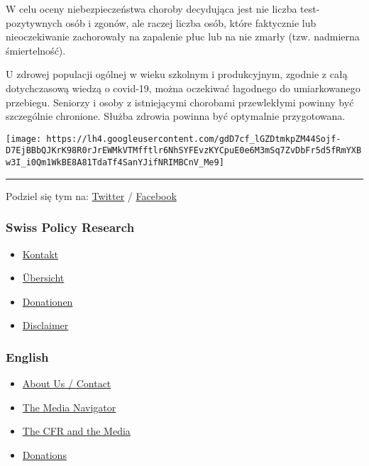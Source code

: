 W celu oceny niebezpieczeństwa choroby decydująca jest nie liczba
test-pozytywnych osób i zgonów, ale raczej liczba osób, które faktycznie
lub nieoczekiwanie zachorowały na zapalenie płuc lub na nie zmarły (tzw.
nadmierna śmiertelność).

U zdrowej populacji ogólnej w wieku szkolnym i produkcyjnym, zgodnie z
całą dotychczasową wiedzą o covid-19, można oczekiwać łagodnego do
umiarkowanego przebiegu. Seniorzy i osoby z istniejącymi chorobami
przewlekłymi powinny być szczególnie chronione. Służba zdrowia powinna
być optymalnie przygotowana.

\texttt{[image: https://lh4.googleusercontent.com/gdD7cf\_lGZDtmkpZM44Sojf-D7EjBBbQJKrK98R0rJrEWMkVTMfftlr6NhSYFEvzKYCpuE0e6M3mSq7ZvDbFr5d5fRmYXBw3I\_i0Qm1WkBE8A81TdaTf4SanYJifNRIMBCnV\_Me9]}

\begin{center}\rule{0.5\linewidth}{\linethickness}\end{center}

Podziel się tym na:
\href{https://twitter.com/intent/tweet?url=https://swprs.org//szwajcarski-lekarz-o-covid-19/}{Twitter}
/
\href{https://www.facebook.com/share.php?u=https://swprs.org//szwajcarski-lekarz-o-covid-19/}{Facebook}

\hypertarget{swiss-policy-research}{%
\subsubsection{Swiss Policy Research}\label{swiss-policy-research}}

\begin{itemize}
\tightlist
\item
  \href{https://swprs.org/kontakt/}{Kontakt}
\item
  \href{https://swprs.org/uebersicht/}{Übersicht}
\item
  \href{https://swprs.org/donationen/}{Donationen}
\item
  \href{https://swprs.org/disclaimer/}{Disclaimer}
\end{itemize}

\hypertarget{english}{%
\subsubsection{English}\label{english}}

\begin{itemize}
\tightlist
\item
  \href{https://swprs.org/contact/}{About Us / Contact}
\item
  \href{https://swprs.org/media-navigator/}{The Media Navigator}
\item
  \href{https://swprs.org/the-american-empire-and-its-media/}{The CFR
  and the Media}
\item
  \href{https://swprs.org/donations/}{Donations}
\end{itemize}

